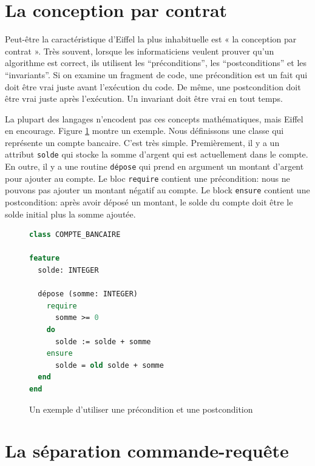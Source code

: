 \documentclass[french]{report}
\begin{document}
\section{La conception par contrat}

Peut-être la caractéristique d'Eiffel la plus inhabituelle est « la conception par contrat ». Très souvent, lorsque les informaticiens veulent prouver qu’un algorithme est correct, ils utilisent les \enquote{préconditions}, les \enquote{postconditions} et les \enquote{invariants}. Si on examine un fragment de code, une précondition est un fait qui doit être vrai juste avant l’exécution du code. De même, une postcondition doit être vrai juste après l’exécution. Un invariant doit être vrai en tout temps.

La plupart des langages n’encodent pas 	ces concepts mathématiques, mais Eiffel en encourage. Figure \ref{fig:pre-post-condition} montre un exemple. Nous définissons une classe qui représente un compte bancaire. C'est très simple. Premièrement, il y a un attribut \texttt{solde} qui stocke la somme d'argent qui est actuellement dans le compte. En outre, il y a une routine \texttt{dépose} qui prend en argument un montant d'argent pour ajouter au compte. Le bloc \texttt{require} contient une précondition: nous ne pouvons pas ajouter un montant négatif au compte. Le block \texttt{ensure} contient une postcondition: après avoir déposé un montant, le solde du compte doit être le solde initial plus la somme ajoutée.

\begin{figure}[h]
	\begin{lstlisting}[language=Eiffel]
class COMPTE_BANCAIRE

feature
  solde: INTEGER

  dépose (somme: INTEGER)
    require
      somme >= 0
    do
      solde := solde + somme
    ensure
      solde = old solde + somme
  end
end
	\end{lstlisting}
	
	\caption{Un exemple d'utiliser une précondition et une postcondition\protect\footnotemark}
	\label{fig:pre-post-condition}
\end{figure}


\section{La séparation commande-requête}
\end{document}
